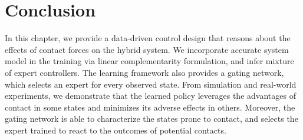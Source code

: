 \section{Conclusion}
\label{sec:moe_conclusion}

In this chapter, we provide a data-driven control design that reasons about the
effects of contact forces on the hybrid system.
%
We incorporate accurate system model in the training via linear complementarity
formulation, and infer mixture of expert controllers.
%
The learning framework also provides a gating network, which selects an expert
for every observed state.
%
From simulation and real-world experiments, we demonstrate that the learned
policy leverages the advantages of contact in some states and minimizes its
adverse effects in others.
%
Moreover, the gating network is able to characterize the states prone to
contact, and selects the expert trained to react to the outcomes of potential
contacts.
